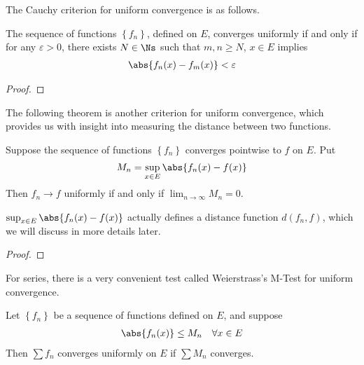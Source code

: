 \documentclass[thmcnt=section, 12pt]{elegantbook}
\begin{document}

\par The Cauchy criterion for uniform convergence is as follows.

\begin{theorem} \label{thm:6}
    The sequence of functions $\left\{f_n\right\}$, defined on $E$, converges uniformly if and only if for any $\varepsilon > 0$, there exists $N \in \Ns$ such that $m, n \geq N$, $x \in E$ implies 
    \begin{align*}
        \abs{f_n(x) - f_m(x)} < \varepsilon
    \end{align*}
\end{theorem}

\begin{proof}
\end{proof}


\par The following theorem is another criterion for uniform convergence, which provides us with insight into measuring the distance between two functions.

\begin{theorem} \label{thm:8}
    Suppose the sequence of functions $\left\{f_n\right\}$ converges pointwise to $f$ on $E$. Put 
    \begin{align*}
        M_n = \sup_{x \in E} \abs{f_n(x) - f(x)}
    \end{align*}
    Then $f_n \to f$ uniformly if and only if $\lim_{n \to \infty} M_n = 0$.
\end{theorem}

\begin{remark}
    $\sup_{x \in E} \abs{f_n(x) - f(x)}$ actually defines a distance function $d(f_n, f)$, which we will discuss in more details later.
\end{remark}

\begin{proof}
\end{proof}


\par For series, there is a very convenient test called Weierstrass's M-Test for uniform convergence.

\begin{theorem} \label{thm:14}
    Let $\left\{f_n\right\}$ be a sequence of functions defined on $E$, and suppose 
    \begin{align*}
        \abs{f_n(x)} \leq M_n \quad \forall x \in E
    \end{align*}
    Then $\sum f_n$ converges uniformly on $E$ if $\sum M_n$ converges.
\end{theorem}
\end{document}
